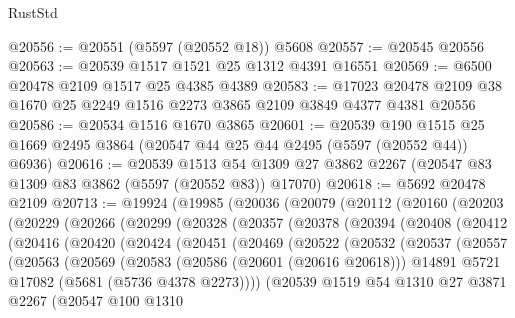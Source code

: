 \begin{lexlean}{RustStd}
\begin{coremodule}
@20556 := @20551 (@5597 (@20552 @18)) @5608
@20557 := @20545 @20556
@20563 := @20539 @1517 @1521 @25 @1312 @4391 @16551
@20569 := @6500 @20478 @2109 @1517 @25 @4385 @4389
@20583 := @17023 @20478 @2109 @38 @1670 @25 @2249 @1516 @2273 @3865 @2109 @3849 @4377 @4381 @20556
@20586 := @20534 @1516 @1670 @3865
@20601 := @20539
    @190
    @1515
    @25
    @1669
    @2495
    @3864
    (@20547 @44 @25 @44 @2495 (@5597 (@20552 @44)) @6936)
@20616 := @20539
    @1513
    @54
    @1309
    @27
    @3862
    @2267
    (@20547 @83 @1309 @83 @3862 (@5597 (@20552 @83)) @17070)
@20618 := @5692 @20478 @2109
@20713 := @19924
    (@19985
      (@20036
        (@20079
          (@20112
            (@20160
              (@20203
                (@20229
                  (@20266
                    (@20299
                      (@20328
                        (@20357
                          (@20378
                            (@20394
                              (@20408
                                (@20412
                                  (@20416
                                    (@20420
                                      (@20424
                                        (@20451
                                          (@20469
                                            (@20522
                                              (@20532
                                                (@20537
                                                  (@20557
                                                    (@20563
                                                      (@20569
                                                        (@20583
                                                          (@20586 (@20601 (@20616 @20618)))
                                                          @14891
                                                          @5721
                                                          @17082
                                                          (@5681 (@5736 @4378 @2273))))
                                                      (@20539
                                                        @1519
                                                        @54
                                                        @1310
                                                        @27
                                                        @3871
                                                        @2267
                                                        (@20547
                                                          @100
                                                          @1310

\end{coremodule}
\end{lexlean}
